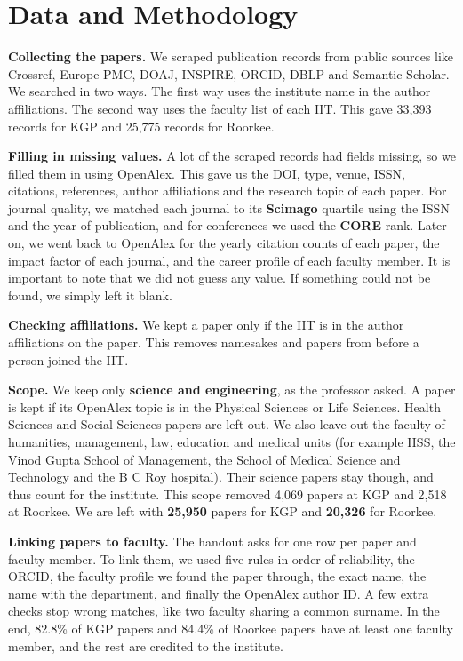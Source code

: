 \documentclass[conference,10pt]{IEEEtran}
\begin{document}
\section{Data and Methodology}\label{sec:data}
\textbf{Collecting the papers.} We scraped publication records from public sources like Crossref, Europe PMC, DOAJ, INSPIRE, ORCID, DBLP and Semantic Scholar. We searched in two ways. The first way uses the institute name in the
author affiliations. The second way uses the faculty list of each IIT. This gave 33,393 records for KGP and 25,775
records for Roorkee.

\textbf{Filling in missing values.} A lot of the scraped records had fields missing, so we filled them in using
OpenAlex. This gave us the DOI, type, venue, ISSN, citations, references, author affiliations and the research topic
of each paper. For journal quality, we matched each journal to its \textbf{Scimago} quartile using the ISSN and the
year of publication, and for conferences we used the \textbf{CORE} rank. Later on, we went back to OpenAlex for the yearly citation counts of each paper, the impact factor of each journal, and the career profile of
each faculty member. It is important to note that we did not guess any value. If something could not be found, we
simply left it blank.

\textbf{Checking affiliations.} We kept a paper only if the IIT is in the author affiliations on the paper. This removes namesakes and papers from before a person joined the IIT.

\textbf{Scope.} We keep only \textbf{science and engineering}, as the professor asked. A paper is kept if its OpenAlex topic is in the Physical Sciences or Life Sciences. Health Sciences and Social Sciences papers are left out. We also leave out the faculty of humanities, management, law, education and medical units (for example HSS, the Vinod Gupta School of Management, the School of Medical Science and Technology and the B C Roy hospital). Their science papers stay though, and thus count for the institute. This scope removed 4,069 papers at KGP and 2,518 at Roorkee. We are left with
\textbf{25,950} papers for KGP and \textbf{20,326} for Roorkee.

\textbf{Linking papers to faculty.} The handout asks for one row per paper and faculty member. To link them, we used five rules in order of reliability, the ORCID, the faculty profile we found the paper through, the exact name, the name with the department, and finally the OpenAlex author ID. A few extra checks stop wrong matches, like two faculty sharing a common surname. In the end, 82.8\% of KGP papers and 84.4\% of Roorkee papers have at least one faculty member, and the rest are credited to the institute.
\end{document}
